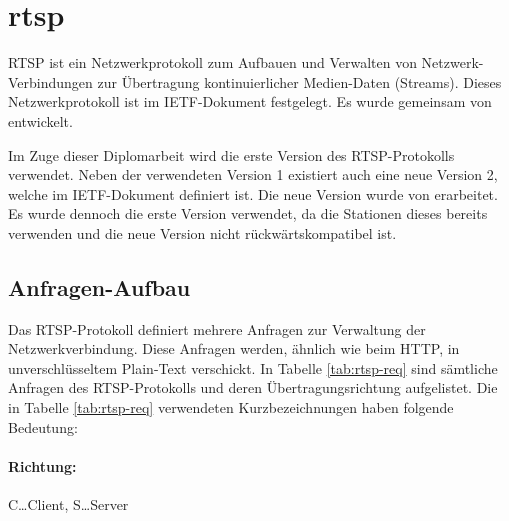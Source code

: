 \section{\acl{rtsp}}
RTSP ist ein Netzwerkprotokoll zum Aufbauen und Verwalten von Netzwerk-Verbindungen zur Übertragung kontinuierlicher Medien-Daten (Streams).
Dieses Netzwerkprotokoll ist im IETF-Dokument  festgelegt. 
Es wurde gemeinsam von \citeauthor{ietf-rtsp} entwickelt. \cite[vgl.][]{ietf-rtsp}\par
Im Zuge dieser Diplomarbeit wird die erste Version des RTSP-Protokolls verwendet.
Neben der verwendeten Version 1 existiert auch eine neue Version 2, welche im IETF-Dokument  definiert ist. Die neue Version wurde von \citeauthor{ietf-rtsp-2} erarbeitet. \cite[vgl.][]{ietf-rtsp-2}
Es wurde dennoch die erste Version verwendet, da die Stationen dieses bereits verwenden und die neue Version nicht rückwärtskompatibel ist.

\subsection{Anfragen-Aufbau}
Das RTSP-Protokoll definiert mehrere Anfragen zur Verwaltung der Netzwerkverbindung.
Diese Anfragen werden, ähnlich wie beim HTTP, in unverschlüsseltem Plain-Text verschickt.
In Tabelle \ref{tab:rtsp-req} sind sämtliche Anfragen des RTSP-Protokolls und deren Übertragungsrichtung aufgelistet.
Die in Tabelle \ref{tab:rtsp-req} verwendeten Kurzbezeichnungen haben folgende Bedeutung:
\paragraph{Richtung:} C\dots Client, S\dots Server
